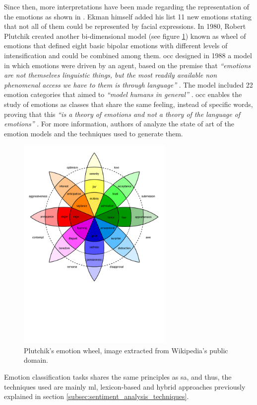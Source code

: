 Since then, more interpretations have been made regarding the representation of the emotions as shown in \cite{cambria2012hourglass}. Ekman himself added his list 11 new emotions stating that not all of them could be represented by facial expressions. In 1980, Robert Plutchik created another bi-dimensional model (see figure \ref{fig:plutchik-wheeel}) known as wheel of emotions that defined eight basic bipolar emotions with different levels of intensification and could be combined among them. \acrfull{occ} designed in 1988 a model in which emotions were driven by an agent, based on the premise that \textit{``emotions are not themselves linguistic things, but the most readily available non phenomenal access we have to them is through language''} \cite{binali2010computational}. The model included 22 emotion categories that aimed to \textit{``model humans in general''} \cite{binali2010computational}. \acrshort{occ} enables the study of emotions as classes that share the same feeling, instead of specific words, proving that this \textit{``is a theory of emotions and not a theory of the language of emotions''} \cite{binali2010computational}. For more information, authors of \cite{binali2012emotion} analyze the state of art of the emotion models and the techniques used to generate them.

\begin{figure}[!htp]
  \center
  \includegraphics[width=0.67\textwidth]{figures/plutchik-wheel}
  \caption{Plutchik's emotion wheel, image extracted from Wikipedia's public domain.}
  \label{fig:plutchik-wheeel}
\end{figure}

Emotion classification tasks shares the same principles as \acrshort{sa}, and thus, the techniques used are mainly \acrshort{ml}, lexicon-based and hybrid approaches previously explained in section \ref{subsec:sentiment_analysis_techniques}.